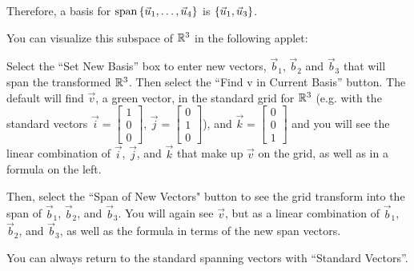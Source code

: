 \documentclass{ximera}
\begin{document}
\begin{solution}
  Therefore, a basis for $\text{span}\left\{\vec{u}_1,\ldots,\vec{u}_4\right\}$ is $\left\{\vec{u}_1,\vec{u}_3\right\}$.

  You can visualize this subspace of $\mathbb{R}^3$ in the following applet:

  Select the ``Set New Basis'' box to enter new vectors, $\vec{b}_1$, $\vec{b}_2$ and $\vec{b}_3$ that will span the transformed $\mathbb{R}^3$. Then select the ``Find v in Current Basis'' button. The default will find $\vec{v}$, a green vector, in the standard grid for $\mathbb{R}^3$ (e.g. with the standard vectors $\vec{i}=\begin{bmatrix}
    1\\0\\0
  \end{bmatrix}$, $\vec{j}=\begin{bmatrix}
    0\\1\\0
  \end{bmatrix}$), and $\vec{k}=\begin{bmatrix}
  0\\0\\1
  \end{bmatrix}$ and you will see the linear combination of $\vec{i}$, $\vec{j}$, and $\vec{k}$ that make up $\vec{v}$ on the grid, as well as in a formula on the left.
  
  Then, select the ``Span of New Vectors" button to see the grid transform into the span of $\vec{b}_1$, $\vec{b}_2$, and $\vec{b}_3$. You will again see $\vec{v}$, but as a linear combination of $\vec{b}_1$, $\vec{b}_2$, and $\vec{b}_3$, as well as the formula in terms of the new span vectors.
  
  You can always return to the standard spanning vectors with ``Standard Vectors''.

  \begin{center}
  \end{center}

\end{solution}

\end{document}
